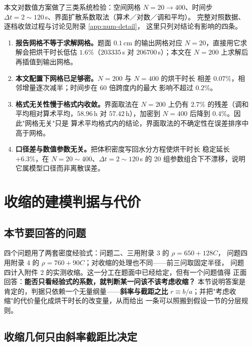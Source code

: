 \documentclass[12pt,a4paper,fontset=none]{ctexart}
\begin{document}
本文对数值方案做了三类系统检验：空间网格 $N=20\to400$、时间步
$\Delta t=2\sim120$\,s、界面扩散系数取法（算术／对数／调和平均）。
完整对照数据、逐档收敛过程与讨论见附录 \ref{app:num-detail}，
这里只列对结论有影响的四条。

\begin{enumerate}
  \item \textbf{报告网格不等于求解网格。}题面 $0.1$\,cm 的输出网格对应
        $N=20$，直接用它求解会把烘干时长低估 $1.6\%$（$203335$\,s 对
        $206700$\,s）；本文在 $N=200$ 上求解后再插值到输出网格。
  \item \textbf{本文配置下网格已足够密。}$N=200$ 与 $N=400$ 的烘干时长
        相差 $0.07\%$，相邻增量逐次减半；时间步在 $60$ 倍跨度内的最大
        影响不超过 $0.2\%$。
  \item \textbf{格式无关性慢于格式内收敛。}界面取法在 $N=200$ 上仍有
        $2.7\%$ 的残差（调和平均相对算术平均，$58.96$\,h 对
        $57.42$\,h），加密到 $N=400$ 后降到 $0.4\%$。因此"网格无关"只是
        算术平均格式内的结论，界面取法的不确定性在误差排序中高于网格。
  \item \textbf{口径差与数值参数无关。}把体积密度写回水分方程使烘干时长
        稳定延长 $+6.3\%$，在 $N=20\sim400$、$\Delta t=2\sim120$\,s 的
        20 组参数组合下不漂移，说明它属模型口径而非离散误差。
\end{enumerate}

\section{收缩的建模判据与代价}
\label{sec:shrink-criterion}

\subsection{本节要回答的问题}

四个问题用了两套密度经验式：问题二、三用附录 3 的 $\rho=650+128C$，
问题四用附录 4 的 $\rho=760+90C$；对收缩的处理也不同——前三问取固定半径，
问题四计入附件 2 的实测收缩。这一分工在题面中已经给定，但有一个问题值得
正面回答：\textbf{能否只看经验式的系数，就判断某一问该不该考虑收缩？}
本节说明答案是肯定的，判据只依赖一个无量纲量——\textbf{斜率与截距之比}
$r\equiv b/a$；并把"考虑收缩"的代价量化成烘干时长的改变量，从而给出
一条可以照搬到假设一节的分层规则。

\subsection{收缩几何只由斜率截距比决定}
\end{document}
